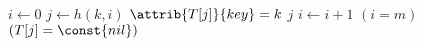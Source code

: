 \begin{codebox}
\li $i \gets 0$
\li \Repeat 
\li     $j \gets h(k,i)$
\li     \If $\attrib{T[j]}{key} = k$
\li     \Then
            \Return $j$
        \End
\li     $i \gets i + 1$
\li \Until $(i = m)$ \Or $(T[j] = \const{nil})$
\li \Return {}
\end{codebox}